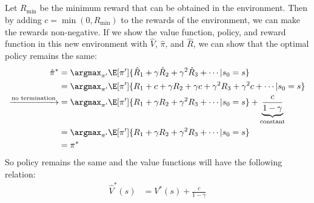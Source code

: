 \documentclass{article}
\begin{document}
\subsection{}
Let \(R_{\min}\) be the minimum reward that can be obtained in the environment. Then by adding \(c = \min(0, R_{\min})\) to the rewards of the environment, we can make the rewards non-negative. If we show the value function, policy, and reward function in this new environment with \(\hat{V}\), \(\hat{\pi}\), and \(\hat{R}\), we can show that the optimal policy remains the same:
\begin{align*}
\hat{\pi}^* &= \argmax_{\pi'} \E[\pi']{\hat{R}_1 + \gamma \hat{R}_2 + \gamma^2 \hat{R}_3 + \cdots | s_0 = s}\\
&= \argmax_{\pi'} \E[\pi']{R_1 + c + \gamma R_2 + \gamma c + \gamma^2 R_3 + \gamma^2 c + \cdots | s_0 = s}\\
\xrightarrow{\text{no termination}}&= \argmax_{\pi'} \E[\pi']{R_1 + \gamma R_2 + \gamma^2 R_3 + \cdots | s_0 = s} + \underbrace{\frac{c}{1 - \gamma}}_{\text{constant}}\\
&= \argmax_{\pi'} \E[\pi']{R_1 + \gamma R_2 + \gamma^2 R_3 + \cdots | s_0 = s}\\
&= \pi^*
\end{align*}
So policy remains the same and the value functions will have the following relation:
\begin{align*}
\hat{V}^*(s) &= V^*(s) + \frac{c}{1 - \gamma}
\end{align*}
\end{document}
